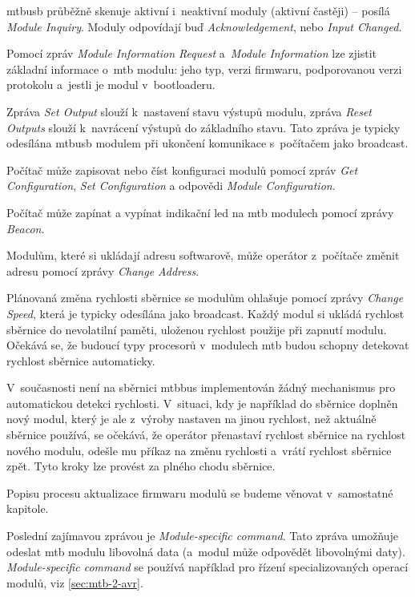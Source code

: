 \gls{mtbusb} průběžně skenuje aktivní i~neaktivní moduly (aktivní častěji)
 – posílá \textit{Module Inquiry}. Moduly odpovídají buď
\textit{Ack\-now\-led\-ge\-ment}, nebo \textit{Input Changed}.

Pomocí zpráv \textit{Module Information Request} a~\textit{Module Information}
lze zjistit základní informace o~\gls{mtb} modulu: jeho typ, verzi firmwaru,
podporovanou verzi protokolu a~jestli je modul v~bootloaderu.

Zpráva \textit{Set Output} slouží k~nastavení stavu výstupů modulu, zpráva
\textit{Reset Outputs} slouží k~navrácení výstupů do základního stavu.
Tato zpráva je typicky odesílána \gls{mtbusb} modulem při ukončení komunikace
s~počítačem jako broadcast.

Počítač může zapisovat nebo číst konfiguraci modulů pomocí zpráv
\textit{Get Configuration}, \textit{Set Configuration} a odpovědi
\textit{Module Configuration}.

Počítač může zapínat a vypínat indikační \gls{led} na \gls{mtb} modulech pomocí
zprávy \textit{Beacon}.

Modulům, které si ukládají adresu softwarově, může operátor z~počítače změnit
adresu pomocí zprávy \textit{Change Address}.

Plánovaná změna rychlosti sběrnice se modulům ohlašuje pomocí zprávy
\textit{Change Speed}, která je typicky odesílána jako broadcast. Každý modul
si ukládá rychlost sběrnice do nevolatilní paměti, uloženou rychlost použije při
zapnutí modulu. Očekává se, že budoucí typy procesorů v~modulech \gls{mtb} budou
schopny detekovat rychlost sběrnice automaticky.

V~současnosti není na sběrnici \gls{mtbbus} implementován žádný mechanismus pro
automatickou detekci rychlosti.  V~situaci, kdy je například do sběrnice
doplněn nový modul, který je ale z~výroby nastaven na jinou rychlost, než
aktuálně sběrnice používá, se očekává, že operátor přenastaví rychlost sběrnice
na rychlost nového modulu, odešle mu příkaz na změnu rychlosti
a~vrátí rychlost sběrnice zpět. Tyto kroky lze provést za plného chodu sběrnice.

Popisu procesu aktualizace firmwaru modulů se budeme věnovat v~samostatné
kapitole.

Poslední zajímavou zprávou je \textit{Module-specific command}. Tato zpráva
umožňuje odeslat \gls{mtb} modulu libovolná data (a~modul může odpovědět
libovolnými daty). \textit{Module-specific command} se používá například pro
řízení specializovaných operací modulů, viz \ref{sec:mtb-2-avr}.


